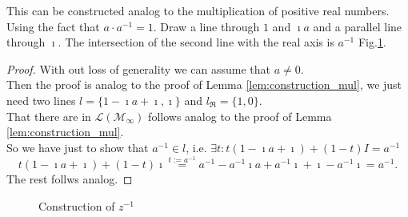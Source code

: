 This can be constructed analog to the multiplication of positive real numbers. Using the fact that $a\cdot a^{-1} = 1$. Draw a line through $1$ and $\imath a$ and a parallel line through $\imath$. The intersection of the second line with the real axis is $a^{-1}$ Fig.\ref{Fig.6}.
\begin{proof}
    With  out loss of generality we can assume that $a \ne 0$.\\
    Then the proof is analog to the proof of Lemma \ref{lem:construction_mul}, we just need two lines $l = \{1-\imath a + \imath, \imath\}$ and $l_{\Re} = \{1,0\}$.\\
    That there are in $\mathcal{L(M_{\infty})}$ follows analog to the proof of Lemma \ref{lem:construction_mul}.\\ 
    So we have just to show that $a^{-1} \in l$, i.e. $\exists t: t  (1 - \imath a + \imath) + (1 - t)  I = a^{-1}$ $$t  (1 - \imath a + \imath) + (1 - t)  \imath \stackrel{t:=a^{-1}}{=}  a^{-1} - a^{-1} \imath a + a^{-1}\imath + \imath - a^{-1}\imath = a^{-1}.$$
    The rest follws analog.
\end{proof}
\begin{figure}[h!]
    \centering
    \caption{Construction of $z^{-1}$}
    \label{Fig.6}
\end{figure}

